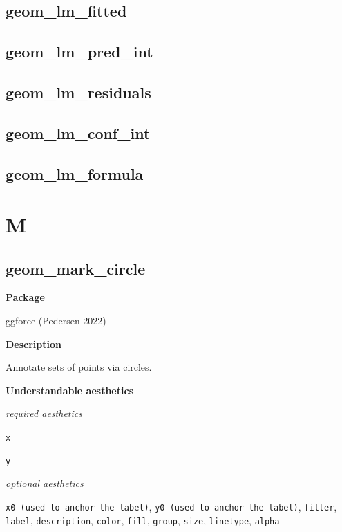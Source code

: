 \documentclass[
  letterpaper,
  DIV=11,
  numbers=noendperiod]{scrreprt}
\begin{document}
\section{geom\_lm\_fitted}\label{geom_lm_fitted}

\section{geom\_lm\_pred\_int}\label{geom_lm_pred_int}

\section{geom\_lm\_residuals}\label{geom_lm_residuals}

\section{geom\_lm\_conf\_int}\label{geom_lm_conf_int}

\section{geom\_lm\_formula}\label{geom_lm_formula}


\chapter{M}\label{sec-m}

\section{geom\_mark\_circle}\label{mark_circle}

\textbf{Package}

ggforce (Pedersen 2022)

\textbf{Description}

Annotate sets of points via circles.

\textbf{Understandable aesthetics}

\emph{required aesthetics}

\texttt{x}

\texttt{y}

\emph{optional aesthetics}

\texttt{x0\ (used\ to\ anchor\ the\ label)},
\texttt{y0\ (used\ to\ anchor\ the\ label)}, \texttt{filter},
\texttt{label}, \texttt{description}, \texttt{color}, \texttt{fill},
\texttt{group}, \texttt{size}, \texttt{linetype}, \texttt{alpha}
\end{document}
